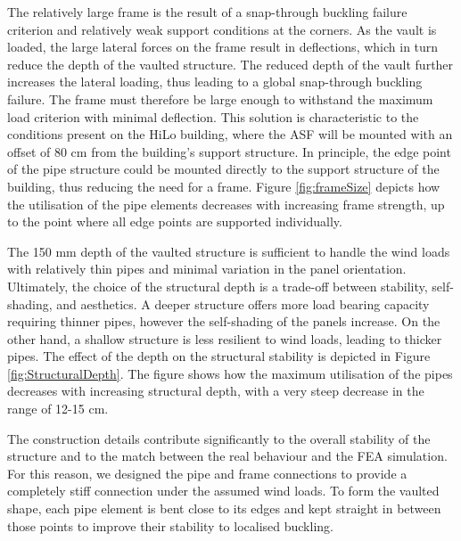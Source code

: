 The relatively large frame is the result of a snap-through buckling failure criterion and relatively weak support conditions at the corners. As the vault is loaded, the large lateral forces on the frame result in deflections, which in turn reduce the depth of the vaulted structure. The reduced depth of the vault further increases the lateral loading, thus leading to a global snap-through buckling failure. The frame must therefore be large enough to withstand the maximum load criterion with minimal deflection. This solution is characteristic to the conditions present on the HiLo building, where the ASF will be mounted with an offset of 80 cm from the building's support structure. In principle, the edge point of the pipe structure could be mounted directly to the support structure of the building, thus reducing the need for a frame. Figure \ref{fig:frameSize} depicts how the utilisation of the pipe elements decreases with increasing frame strength, up to the point where all edge points are supported individually. 

The 150 mm depth of the vaulted structure is sufficient to handle the wind loads with relatively thin pipes and minimal variation in the panel orientation. Ultimately, the choice of the structural depth is a trade-off between stability,  self-shading, and aesthetics. A deeper structure offers more load bearing capacity requiring thinner pipes, however the self-shading of the panels increase. On the other hand, a shallow structure is less resilient to wind loads, leading to thicker pipes. The effect of the depth on the structural stability is depicted in Figure \ref{fig:StructuralDepth}. The figure shows how the maximum utilisation of the pipes decreases with increasing structural depth, with a very steep decrease in the range of 12-15 cm. 

The construction details contribute significantly to the overall stability of the structure and to the match between the real behaviour and the FEA simulation. For this reason, we designed the pipe and frame connections to provide a completely stiff connection under the assumed wind loads. To form the vaulted shape, each pipe element is bent close to its edges and kept straight in between those points to improve their stability to localised buckling.


